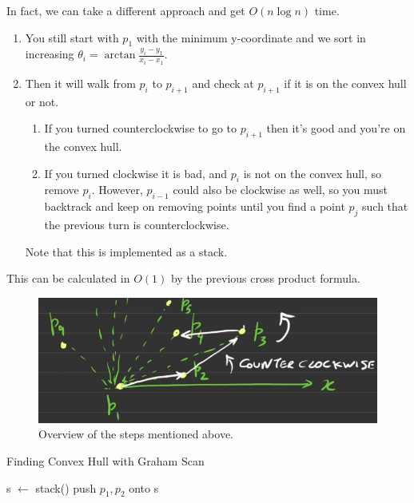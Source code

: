 \documentclass{article}
\begin{document}
    \begin{example}
      In fact, we can take a different approach and get $O(n \log{n})$ time. 
      \begin{enumerate}
        \item You still start with $p_1$ with the minimum y-coordinate and we sort in increasing $\theta_i = \arctan \frac{y_i - y_1}{x_i - x_1}$. 
        \item Then it will walk from $p_i$ to $p_{i+1}$ and check at $p_{i+1}$ if it is on the convex hull or not. 
          \begin{enumerate}
            \item If you turned counterclockwise to go to $p_{i+1}$ then it's good and you're on the convex hull. 
            \item If you turned clockwise it is bad, and $p_i$ is not on the convex hull, so remove $p_i$. However, $p_{i-1}$ could also be clockwise as well, so you must backtrack and keep on removing points until you find a point $p_j$ such that the previous turn is counterclockwise. 
          \end{enumerate}
          Note that this is implemented as a stack. 
      \end{enumerate}
      This can be calculated in $O(1)$ by the previous cross product formula. 
      \begin{figure}[H]
        \centering 
        \includegraphics[scale=0.4]{img/graham.png}
        \caption{Overview of the steps mentioned above. } 
        \label{fig:graham}
      \end{figure}
      \begin{algorithm}[H]
        \caption{Finding Convex Hull with Graham Scan}
        \label{alg:graham}
        \begin{algorithmic}
            \State s $\gets$ stack()
            \State push $p_1, p_2$ onto s 

\end{algorithmic}
\end{algorithm}
\end{example}
\end{document}
